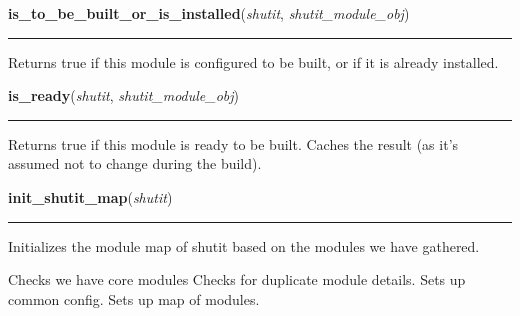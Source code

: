     \label{shutit_main:is_to_be_built_or_is_installed}

    \vspace{0.5ex}

\hspace{.8\funcindent}\begin{boxedminipage}{\funcwidth}

    \raggedright \textbf{is\_to\_be\_built\_or\_is\_installed}(\textit{shutit}, \textit{shutit\_module\_obj})

    \vspace{-1.5ex}

    \rule{\textwidth}{0.5\fboxrule}
\setlength{\parskip}{2ex}
    Returns true if this module is configured to be built, or if it is 
    already installed.

\setlength{\parskip}{1ex}
    \end{boxedminipage}

    \label{shutit_main:is_ready}

    \vspace{0.5ex}

\hspace{.8\funcindent}\begin{boxedminipage}{\funcwidth}

    \raggedright \textbf{is\_ready}(\textit{shutit}, \textit{shutit\_module\_obj})

    \vspace{-1.5ex}

    \rule{\textwidth}{0.5\fboxrule}
\setlength{\parskip}{2ex}
    Returns true if this module is ready to be built. Caches the result (as
    it's assumed not to change during the build).

\setlength{\parskip}{1ex}
    \end{boxedminipage}

    \label{shutit_main:init_shutit_map}

    \vspace{0.5ex}

\hspace{.8\funcindent}\begin{boxedminipage}{\funcwidth}

    \raggedright \textbf{init\_shutit\_map}(\textit{shutit})

    \vspace{-1.5ex}

    \rule{\textwidth}{0.5\fboxrule}
\setlength{\parskip}{2ex}
    Initializes the module map of shutit based on the modules we have 
    gathered.

    Checks we have core modules Checks for duplicate module details. Sets 
    up common config. Sets up map of modules.

\setlength{\parskip}{1ex}
    \end{boxedminipage}

